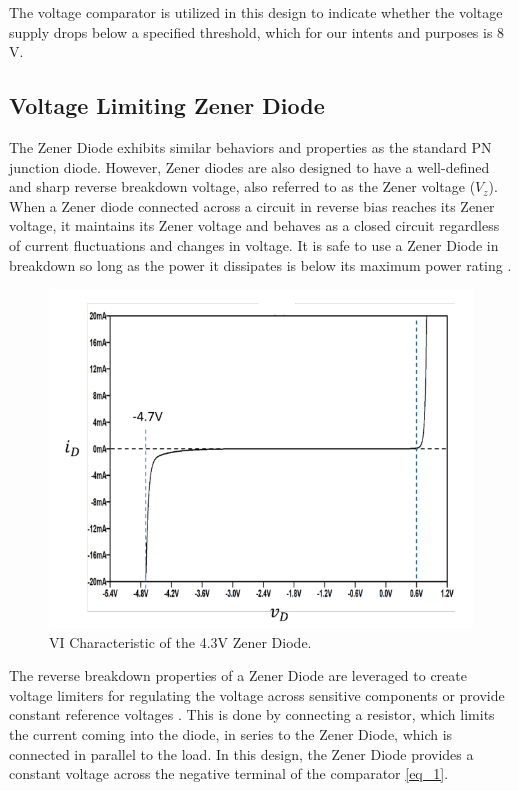 \documentclass[conference]{IEEEtran}
\begin{document}
The voltage comparator is utilized in this design to indicate whether the voltage supply drops below a specified threshold, which for our intents and purposes is 8 V.

\subsection{Voltage Limiting Zener Diode}
The Zener Diode exhibits similar behaviors and properties as the standard PN junction diode. However, Zener diodes are also designed to have a well-defined and sharp reverse breakdown voltage, also referred to as the Zener voltage ($V_z$). When a Zener diode connected across a circuit in reverse bias reaches its Zener voltage, it maintains its Zener voltage and behaves as a closed circuit regardless of current fluctuations and changes in voltage. It is safe to use a Zener Diode in breakdown so long as the power it dissipates is below its maximum power rating \cite{week7}.

\begin{figure}[htbp]
\centerline{\includegraphics{./images/vi-characteristics.png}}
\caption{VI Characteristic of the 4.3V Zener Diode. \cite{week7}}
\label{fig}
\end{figure}

The reverse breakdown properties of a Zener Diode are leveraged to create voltage limiters for regulating the voltage across sensitive components or provide constant reference voltages \cite{week7}. This is done by connecting a resistor, which limits the current coming into the diode, in series to the Zener Diode, which is connected in parallel to the load. In this design, the Zener Diode provides a constant voltage across the negative terminal of the comparator \eqref{eq_1}.
\end{document}
